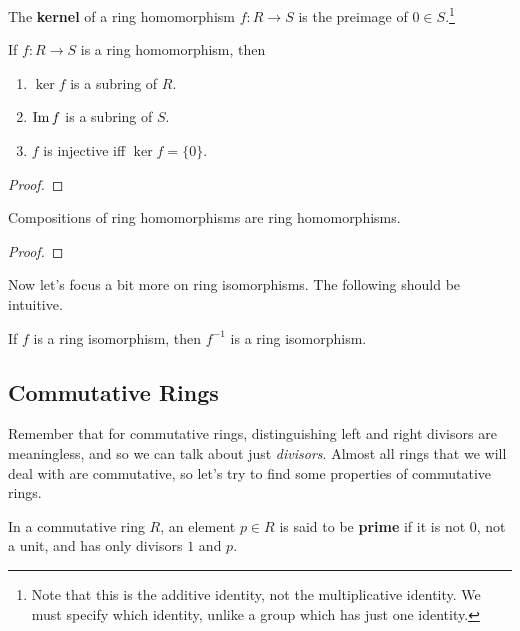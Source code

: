   \begin{definition}[Kernel]
    The \textbf{kernel} of a ring homomorphism $f: R \rightarrow S$ is the preimage of $0 \in S$.\footnote{Note that this is the additive identity, not the multiplicative identity. We must specify which identity, unlike a group which has just one identity.}
  \end{definition}

  \begin{lemma}
    If $f: R \rightarrow S$ is a ring homomorphism, then 
    \begin{enumerate}
      \item $\ker{f}$ is a subring of $R$. 
      \item $\operatorname{Im}{f}$ is a subring of $S$. 
      \item $f$ is injective iff $\ker{f} = \{0\}$. 
    \end{enumerate}
  \end{lemma}
  \begin{proof}

  \end{proof}

  \begin{theorem}
    Compositions of ring homomorphisms are ring homomorphisms. 
  \end{theorem} 
  \begin{proof}
    
  \end{proof}

  Now let's focus a bit more on ring isomorphisms. The following should be intuitive. 

  \begin{lemma}
    If $f$ is a ring isomorphism, then $f^{-1}$ is a ring isomorphism. 
  \end{lemma}

\subsection{Commutative Rings} 

  Remember that for commutative rings, distinguishing left and right divisors are meaningless, and so we can talk about just \textit{divisors}. Almost all rings that we will deal with are commutative, so let's try to find some properties of commutative rings.  

  \begin{definition}
    In a commutative ring $R$, an element $p \in R$ is said to be \textbf{prime} if it is not $0$, not a unit, and has only divisors $1$ and $p$. 
  \end{definition}

